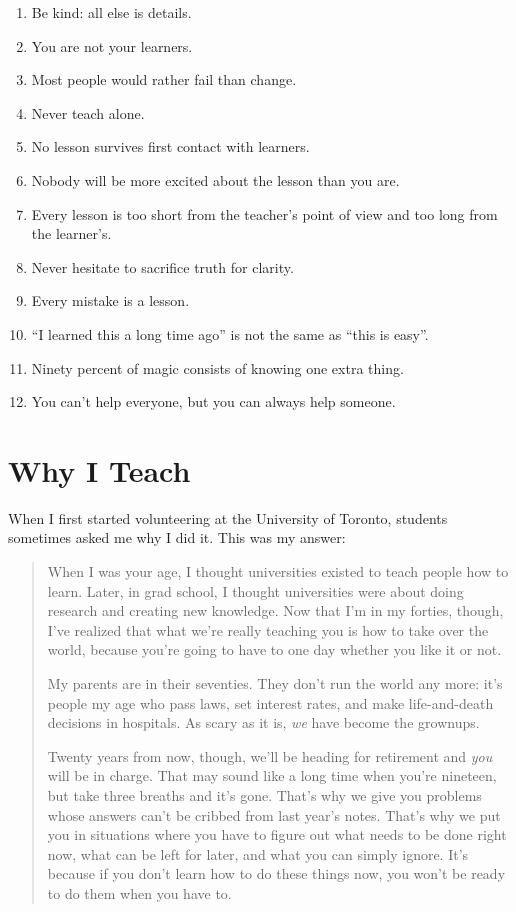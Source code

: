 \documentclass[10pt,statementpaper]{memoir}
\begin{document}
\begin{enumerate}
\def\labelenumi{\arabic{enumi}.}
\item
  Be kind: all else is details.
\item
  {You are not your learners.}
\item
  {Most people would rather fail than change.}
\item
  Never teach alone.
\item
  No lesson survives first contact with learners.
\item
  Nobody will be more excited about the lesson than you are.
\item
  Every lesson is too short from the teacher's point of view and too
  long from the learner's.
\item
  Never hesitate to sacrifice truth for clarity.
\item
  Every mistake is a lesson.
\item
  ``I learned this a long time ago'' is not the same as ``this is
  easy''.
\item
  Ninety percent of magic consists of knowing one extra thing.
\item
  You can't help everyone, but you can always help someone.
\end{enumerate}

\chapter{Why I Teach}\label{why-i-teach}

When I first started volunteering at the University of Toronto, students
sometimes asked me why I did it. This was my answer:

\begin{quote}
When I was your age, I thought universities existed to teach people how
to learn. Later, in grad school, I thought universities were about doing
research and creating new knowledge. Now that I'm in my forties, though,
I've realized that what we're really teaching you is how to take over
the world, because you're going to have to one day whether you like it
or not.

My parents are in their seventies. They don't run the world any more:
it's people my age who pass laws, set interest rates, and make
life-and-death decisions in hospitals. As scary as it is, \emph{we} have
become the grownups.

Twenty years from now, though, we'll be heading for retirement and
\emph{you} will be in charge. That may sound like a long time when
you're nineteen, but take three breaths and it's gone. That's why we
give you problems whose answers can't be cribbed from last year's notes.
That's why we put you in situations where you have to figure out what
needs to be done right now, what can be left for later, and what you can
simply ignore. It's because if you don't learn how to do these things
now, you won't be ready to do them when you have to.
\end{quote}
\end{document}

